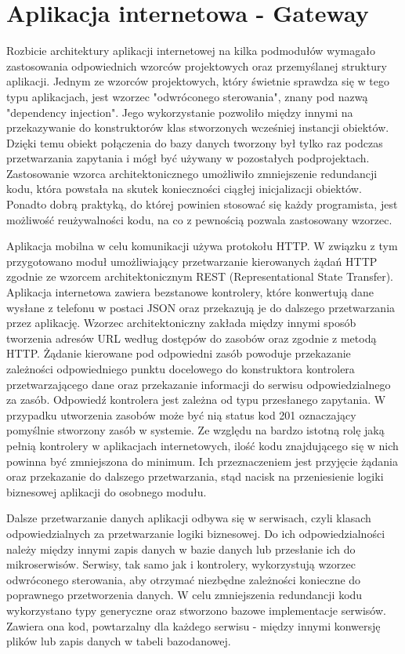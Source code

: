 \section{Aplikacja internetowa - Gateway}	
{	Rozbicie architektury aplikacji internetowej na kilka podmodułów wymagało zastosowania odpowiednich wzorców projektowych oraz przemyślanej struktury aplikacji. Jednym ze wzorców projektowych, który świetnie sprawdza się w tego typu aplikacjach, jest wzorzec "odwróconego sterowania", znany pod nazwą "dependency injection". Jego wykorzystanie pozwoliło między innymi na przekazywanie do konstruktorów klas stworzonych wcześniej instancji obiektów. Dzięki temu obiekt połączenia do bazy danych tworzony był tylko raz podczas przetwarzania zapytania i mógł być używany w pozostałych podprojektach. Zastosowanie wzorca architektonicznego umożliwiło zmniejszenie redundancji kodu, która powstała na skutek konieczności ciągłej inicjalizacji obiektów. Ponadto dobrą praktyką, do której powinien stosować się każdy programista, jest możliwość reużywalności kodu, na co z pewnością pozwala zastosowany wzorzec. 

Aplikacja mobilna w celu komunikacji używa protokołu HTTP. W związku z tym 	 przygotowano moduł umożliwiający przetwarzanie kierowanych żądań HTTP zgodnie ze wzorcem architektonicznym REST (Representational State Transfer). Aplikacja internetowa zawiera bezstanowe kontrolery, które konwertują dane wysłane z telefonu w postaci JSON oraz przekazują je do dalszego przetwarzania przez aplikację. Wzorzec architektoniczny zakłada między innymi sposób tworzenia adresów URL według dostępów do zasobów oraz zgodnie z metodą HTTP. Żądanie kierowane pod odpowiedni zasób powoduje przekazanie zależności odpowiedniego punktu docelowego do konstruktora kontrolera przetwarzającego dane oraz przekazanie informacji do serwisu odpowiedzialnego za zasób. Odpowiedź kontrolera jest zależna od typu przesłanego zapytania. W przypadku utworzenia zasobów może być nią status kod 201 oznaczający pomyślnie stworzony zasób w systemie. Ze względu na bardzo istotną rolę jaką pełnią kontrolery w aplikacjach internetowych, ilość kodu znajdującego się w nich powinna być zmniejszona do minimum. Ich przeznaczeniem jest przyjęcie żądania oraz przekazanie do dalszego przetwarzania, stąd nacisk na przeniesienie logiki biznesowej aplikacji do osobnego modułu.

Dalsze przetwarzanie danych aplikacji odbywa się w serwisach, czyli klasach odpowiedzialnych za przetwarzanie logiki biznesowej. Do ich odpowiedzialności należy między innymi zapis danych w bazie danych lub przesłanie ich do mikroserwisów. Serwisy, tak samo jak i kontrolery, wykorzystują wzorzec odwróconego sterowania, aby otrzymać niezbędne zależności konieczne do poprawnego przetworzenia danych. W celu zmniejszenia redundancji kodu wykorzystano typy generyczne oraz stworzono bazowe implementacje serwisów. Zawiera ona kod, powtarzalny dla każdego serwisu - między innymi konwersję plików lub zapis danych w tabeli bazodanowej. 

}
